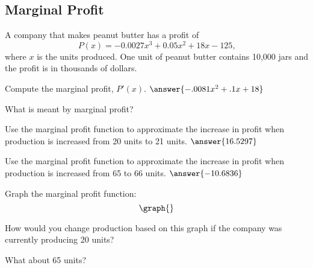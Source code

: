 \documentclass{ximera}
\begin{document}
\subsection{Marginal Profit}
A company that makes peanut butter has a profit of $$P(x)=-0.0027x^3+0.05x^2+18x-125\text{,}$$ where $x$ is the units produced. One unit of peanut butter contains 10,000 jars and the profit is in thousands of dollars.
\begin{question}
Compute the marginal profit, $P'(x)$. $\answer{-.0081x^2+.1x+18}$

What is meant by marginal profit?
\begin{freeResponse}
\end{freeResponse}
\end{question}
\begin{question}
Use the marginal profit function to approximate the increase in profit when production is increased from 20 units to 21 units.
$\answer{16.5297}$
\end{question}
\begin{question}
Use the marginal profit function to approximate the increase in profit when production is increased from 65 to 66 units. $\answer{-10.6836}$
\end{question}
\begin{question}
Graph the marginal profit function:
\[
\graph{}
\]

How would you change production based on this graph if the company was currently producing 20 units? 
\begin{multipleChoice}
\end{multipleChoice}
What about 65 units?
\begin{multipleChoice}
\end{multipleChoice}
\end{question}
\setcounter{problem}{0}
\end{document}
